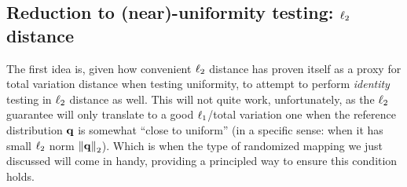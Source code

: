 \subsection{Reduction to (near)-uniformity testing: $\lp[2]$ distance}
	\label{ssec:l2:reduction}
The first idea is, given how convenient $\lp[2]$ distance has proven itself as a proxy for total variation distance when testing uniformity, to attempt to perform \emph{identity} testing in $\lp[2]$ distance as well. This will not quite work, unfortunately, as the $\lp[2]$ guarantee will only translate to a good $\lp[1]$/total variation one when the reference distribution $\q$ is somewhat ``close to uniform'' (in a specific sense: when it has small $\lp[2]$ norm $\normtwo{\q}$). Which is when the type of randomized mapping we just discussed will come in handy, providing a principled way to ensure this condition holds. 

